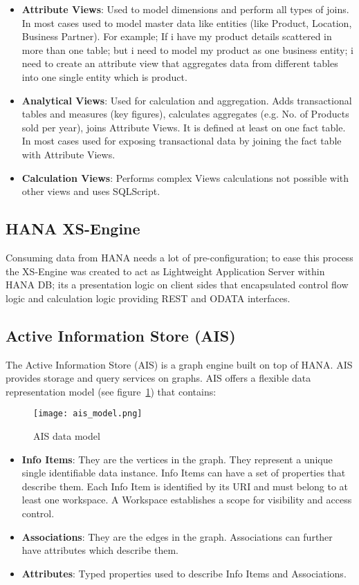 \begin{itemize}
	\item \textbf{Attribute Views}: Used to model dimensions and perform all types of joins. In most cases used to model master data like entities (like Product, Location, Business Partner). For example; If i have my product details scattered in more than one table; but i need to model my product as one business entity; i need to create an attribute view that aggregates data from different tables into one single entity which is product.
	\item \textbf{Analytical Views}: Used for calculation and aggregation. Adds transactional tables and measures (key figures), calculates aggregates (e.g. No. of Products sold per year), joins Attribute Views. It is defined at least on one fact table. In most cases used for exposing transactional data by joining the fact table with Attribute Views.
	\item \textbf{Calculation Views}: Performs complex Views calculations not possible with other views and uses SQLScript.
\end{itemize}

\subsection{HANA XS-Engine}

Consuming data from HANA needs a lot of pre-configuration; to ease this process the XS-Engine was created to act as Lightweight Application Server within HANA DB; its a presentation logic on client sides that encapsulated control flow logic and calculation logic providing REST and ODATA interfaces.

\subsection{Active Information Store (AIS)} \label{ais}

The Active Information Store (AIS) is a graph engine built on top of HANA. AIS provides storage and query services on graphs. AIS offers a flexible data representation model (see figure~\ref{fig:ais}) that contains:

\begin{figure}[htbp]
\centering
	\texttt{[image: ais\_model.png]}
	\caption{AIS data model}
	\label{fig:ais}
\end{figure}

\begin{itemize}
	\item \textbf{Info Items}: They are the vertices in the graph. They represent a unique single identifiable data instance. Info Items can have a set of properties that describe them. Each Info Item is identified by its URI and must belong to at least one workspace. A Workspace establishes a scope for visibility and access control.
	\item \textbf{Associations}: They are the edges in the graph. Associations can further have attributes which describe them.
	\item \textbf{Attributes}: Typed properties used to describe Info Items and Associations.
\end{itemize}

